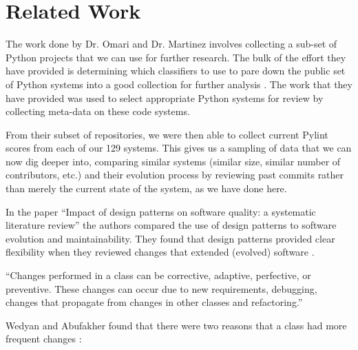 \documentclass[12pt,conference]{IEEEtran}
\begin{document}

\vspace{0.5cm}
\section{Related Work}
\vspace{0.25cm}

The work done by Dr. Omari and Dr. Martinez involves collecting a sub-set of Python projects that we can use for further research. The bulk of the effort they have provided is determining which classifiers to use to pare down the public set of Python systems into a good collection for further analysis \cite{omari:2018}. The work that they have provided was used to select appropriate Python systems for review by collecting meta-data on these code systems.

From their subset of repositories, we were then able to collect current Pylint scores from each of our 129 systems. This gives us a sampling of data that we can now dig deeper into, comparing similar systems (similar size, similar number of contributors, etc.) and their evolution process by reviewing past commits rather than merely the current state of the system, as we have done here.

In the paper ``Impact of design patterns on software quality: a systematic literature review'' the authors compared the use of design patterns to software evolution and maintainability. They found that design patterns provided clear flexibility when they reviewed changes that extended (evolved) software \cite{wedyan:2020}.

\vspace{0.25cm}

\begin{displayquote}
``Changes performed in a class can be corrective, adaptive, perfective, or preventive. These changes can occur due to new requirements, debugging, changes that propagate from changes in other classes and refactoring.''
\end{displayquote}

\vspace{0.25cm}

Wedyan and Abufakher found that there were two reasons that a class had more frequent changes \cite{wedyan:2020}:

\vspace{0.25cm}
\end{document}
